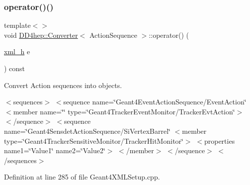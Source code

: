 \hypertarget{struct_d_d4hep_1_1_converter_a478d8d37b4de2a798ac86925b24e069b}{}\label{struct_d_d4hep_1_1_converter_a478d8d37b4de2a798ac86925b24e069b} 
\subsubsection{\texorpdfstring{operator()()}{operator()()}\hspace{0.1cm}{\footnotesize\ttfamily [15/22]}}
{\footnotesize\ttfamily template$<$$>$ \\
void \hyperlink{struct_d_d4hep_1_1_converter}{D\+D4hep\+::\+Converter}$<$ Action\+Sequence $>$\+::operator() (\begin{DoxyParamCaption}\item[{\hyperlink{_det_factory_helper_8h_ac13b3c79d2bc9214ff0cf5b8dc43dda6}{xml\+\_\+h}}]{e }\end{DoxyParamCaption}) const}



Convert Action sequences into objects. 

$<$sequences$>$ $<$sequence name=\char`\"{}\+Geant4\+Event\+Action\+Sequence/\+Event\+Action\char`\"{} $<$member name=\char`\"{}\char`\"{} type=\char`\"{}\+Geant4\+Tracker\+Event\+Monitor/\+Tracker\+Evt\+Action\char`\"{}$>$ $<$/sequence$>$ $<$sequence name=\char`\"{}\+Geant4\+Sensdet\+Action\+Sequence/\+Si\+Vertex\+Barrel\char`\"{} $<$member type=\char`\"{}\+Geant4\+Tracker\+Sensitive\+Monitor/\+Tracker\+Hit\+Monitor\char`\"{}$>$ $<$properties name1=\char`\"{}\+Value1\char`\"{} name2=\char`\"{}\+Value2\char`\"{}$>$ $<$/member$>$ $<$/sequence$>$ $<$/sequences$>$ 

Definition at line 285 of file Geant4\+X\+M\+L\+Setup.\+cpp.



